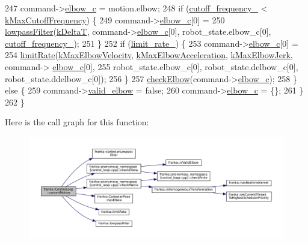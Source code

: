 \begin{DoxyCode}
247     command->\hyperlink{structresearch__interface_1_1robot_1_1MotionGeneratorCommand_a04b8ac36d04098c1f7b2935bb954af95}{elbow\_c} = motion.elbow;
248     \textcolor{keywordflow}{if} (\hyperlink{classfranka_1_1ControlLoop_a1c01098536341d3e1da2617a08129529}{cutoff\_frequency\_} < \hyperlink{namespacefranka_adb10b364af8deb9e17d9bcc1ff2695be}{kMaxCutoffFrequency}) \{
249       command->\hyperlink{structresearch__interface_1_1robot_1_1MotionGeneratorCommand_a04b8ac36d04098c1f7b2935bb954af95}{elbow\_c}[0] =
250           \hyperlink{namespacefranka_a94c21b0e87afce0147a9cd6025c239ca}{lowpassFilter}(\hyperlink{namespacefranka_a1e207a0d5a6e90c1e1a78e6e1057120a}{kDeltaT}, command->\hyperlink{structresearch__interface_1_1robot_1_1MotionGeneratorCommand_a04b8ac36d04098c1f7b2935bb954af95}{elbow\_c}[0], robot\_state.elbow\_c[0], 
      \hyperlink{classfranka_1_1ControlLoop_a1c01098536341d3e1da2617a08129529}{cutoff\_frequency\_});
251     \}
252     \textcolor{keywordflow}{if} (\hyperlink{classfranka_1_1ControlLoop_a660f32d739c7f7ed05fa97b06220b98b}{limit\_rate\_}) \{
253       command->\hyperlink{structresearch__interface_1_1robot_1_1MotionGeneratorCommand_a04b8ac36d04098c1f7b2935bb954af95}{elbow\_c}[0] =
254           \hyperlink{namespacefranka_a77e127a920da5b0ad29877ec3ff29f15}{limitRate}(\hyperlink{namespacefranka_a2896b2e0c8bd96f9ee242c1203ac3483}{kMaxElbowVelocity}, 
      \hyperlink{namespacefranka_af365e574ad7b1580ce15e30dd909b3ba}{kMaxElbowAcceleration}, \hyperlink{namespacefranka_adc70178204d4da073c78de777a2dff74}{kMaxElbowJerk}, command->
      \hyperlink{structresearch__interface_1_1robot_1_1MotionGeneratorCommand_a04b8ac36d04098c1f7b2935bb954af95}{elbow\_c}[0],
255                     robot\_state.elbow\_c[0], robot\_state.delbow\_c[0], robot\_state.ddelbow\_c[0]);
256     \}
257     \hyperlink{namespacefranka_1_1anonymous__namespace_02control__loop_8cpp_03_a36007bd7eb2c55ea2c41d6bdad9c5abc}{checkElbow}(command->\hyperlink{structresearch__interface_1_1robot_1_1MotionGeneratorCommand_a04b8ac36d04098c1f7b2935bb954af95}{elbow\_c});
258   \} \textcolor{keywordflow}{else} \{
259     command->\hyperlink{structresearch__interface_1_1robot_1_1MotionGeneratorCommand_a1ad30cc0b7210a2d93914e3f98c0ef22}{valid\_elbow} = \textcolor{keyword}{false};
260     command->\hyperlink{structresearch__interface_1_1robot_1_1MotionGeneratorCommand_a04b8ac36d04098c1f7b2935bb954af95}{elbow\_c} = \{\};
261   \}
262 \}
\end{DoxyCode}
Here is the call graph for this function\+:
\nopagebreak
\begin{figure}[H]
\begin{center}
\leavevmode
\includegraphics[width=350pt]{classfranka_1_1ControlLoop_a1b12d574fd73dfeab9d44cc662435fb6_cgraph}
\end{center}
\end{figure}
